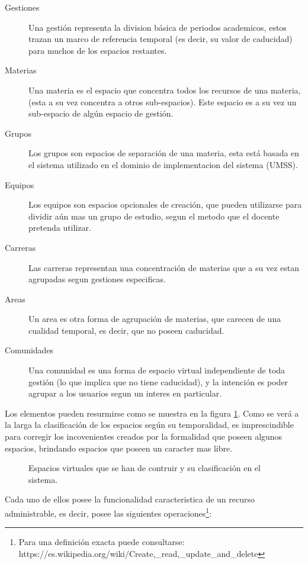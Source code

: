 \begin{description}
\item [Gestiones] Una gestión representa la division básica de periodos
academicos, estos trazan un marco de referencia temporal (es decir, su valor de
caducidad) para muchos de los espacios restantes.
\item [Materias] Una materia es el espacio que concentra todos los recursos de
una materia, (esta a su vez concentra a otros sub-espacios). Este espacio es a
su vez un sub-espacio de algún espacio de gestión.
\item [Grupos] Los grupos son espacios de separación de una materia, esta está
basada en el sistema utilizado en el dominio de implementacion del sistema
(UMSS).
\item [Equipos] Los equipos son espacios opcionales de creación, que pueden
utilizarse para dividir aún mas un grupo de estudio, segun el metodo que el
docente pretenda utilizar.
\item [Carreras] Las carreras representan una concentración de materias que a su
vez estan agrupadas segun gestiones especificas.
\item [Areas] Un area es otra forma de agrupación de materias, que carecen de
una cualidad temporal, es decir, que no poseen caducidad.
\item [Comunidades] Una comunidad es una forma de espacio virtual independiente
de toda gestión (lo que implica que no tiene caducidad), y la intención es poder
agrupar a los usuarios segun un interes en particular.
\end{description}

Los elementos pueden resurmirse como se muestra en la figura \ref{espacios}.
Como se verá a la larga la clasificación de los espacios según su temporalidad,
es imprescindible para corregir los incovenientes creados por la formalidad que
poseen algunos espacios, brindando espacios que poseen un caracter mas libre.

\begin{figure}
\centering

\caption{Espacios virtuales que se han de contruir y su clasificación en el
sistema.}
\label{espacios}
\end{figure}

Cada uno de ellos posee la funcionalidad caracteristica de un recurso
administrable, es decir, posee las siguientes operaciones\footnote{Para una
definición exacta puede consultarse:
https://es.wikipedia.org/wiki/Create,\_read,\_update\_and\_delete}:

